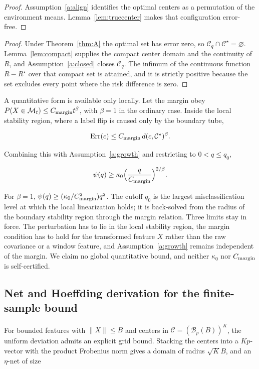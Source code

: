 \begin{proof}
Assumption~\ref{a:align} identifies the optimal centers as a permutation of the environment means. Lemma~\ref{lem:truecenter} makes that configuration error-free.
\end{proof}

\begin{proof}
Under Theorem~\ref{thm:A} the optimal set has error zero, so $\mathcal C_q\cap\mathcal C^\star=\varnothing$. Lemma~\ref{lem:compact} supplies the compact center domain and the continuity of $R$, and Assumption~\ref{a:closed} closes $\mathcal C_q$. The infimum of the continuous function $R-R^\star$ over that compact set is attained, and it is strictly positive because the set excludes every point where the risk difference is zero.
\end{proof}

A quantitative form is available only locally. Let the margin obey
\(P(X\in\mathcal M_t)\le C_{\rm margin}t^\beta\), with \(\beta=1\) in
the ordinary case. Inside the local stability region, where a label flip
is caused only by the boundary tube,

\[\mathrm{Err}(c)\le C_{\rm margin}\,d(c,\mathcal C^\star)^\beta.\]

Combining this with Assumption~\ref{a:growth} and
restricting to \(0<q\le q_0\),

\[\psi(q)\ge\kappa_0\Big(\frac{q}{C_{\rm margin}}\Big)^{2/\beta}.\]

For \(\beta=1\), \(\psi(q)\ge(\kappa_0/C_{\rm margin}^2)q^2\). The
cutoff \(q_0\) is the largest misclassification level at which the local
linearization holds; it is back-solved from the radius of the boundary
stability region through the margin relation. Three limits stay in
force. The perturbation has to lie in the local stability region, the
margin condition has to hold for the transformed feature \(X\) rather
than the raw covariance or a window feature, and
Assumption~\ref{a:growth} remains independent of the
margin. We claim no global quantitative bound, and neither \(\kappa_0\)
nor \(C_{\rm margin}\) is self-certified.

\subsection{Net and Hoeffding derivation for the finite-sample
bound}\label{net-and-hoeffding-derivation-for-the-finite-sample-bound}

For bounded features with \(\|X\|\le B\) and centers in
\(\mathcal C=(\mathcal B_p(B))^K\), the uniform deviation admits an
explicit grid bound. Stacking the centers into a \(Kp\)-vector with the
product Frobenius norm gives a domain of radius \(\sqrt K B\), and an
\(\eta\)-net of size

